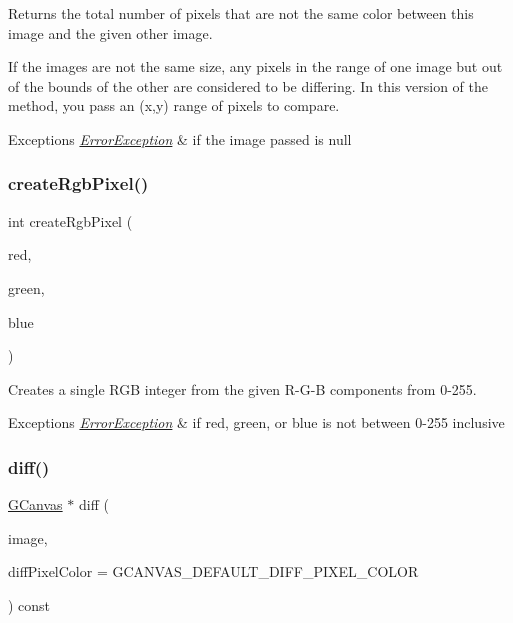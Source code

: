 Returns the total number of pixels that are not the same color between this image and the given other image. 

If the images are not the same size, any pixels in the range of one image but out of the bounds of the other are considered to be differing. In this version of the method, you pass an (x,y) range of pixels to compare. 
\begin{DoxyExceptions}{Exceptions}
{\em \mbox{\hyperlink{classErrorException}{Error\+Exception}}} & if the image passed is null \\
\hline
\end{DoxyExceptions}
\mbox{\label{classGCanvas_a10beefcf8631433d0cdddefd4e24c76a}} 
\subsubsection{\texorpdfstring{create\+Rgb\+Pixel()}{createRgbPixel()}}
{\footnotesize\ttfamily int create\+Rgb\+Pixel (\begin{DoxyParamCaption}\item[{int}]{red,  }\item[{int}]{green,  }\item[{int}]{blue }\end{DoxyParamCaption})\hspace{0.3cm}{\ttfamily [static]}}



Creates a single R\+GB integer from the given R-\/\+G-\/B components from 0-\/255. 


\begin{DoxyExceptions}{Exceptions}
{\em \mbox{\hyperlink{classErrorException}{Error\+Exception}}} & if red, green, or blue is not between 0-\/255 inclusive \\
\hline
\end{DoxyExceptions}
\mbox{\label{classGCanvas_aa4e74e40eebb70c9616065056de5c4ca}} 
\subsubsection{\texorpdfstring{diff()}{diff()}\hspace{0.1cm}{\footnotesize\ttfamily [1/2]}}
{\footnotesize\ttfamily \mbox{\hyperlink{classGCanvas}{G\+Canvas}} $\ast$ diff (\begin{DoxyParamCaption}\item[{const \mbox{\hyperlink{classGCanvas}{G\+Canvas}} \&}]{image,  }\item[{int}]{diff\+Pixel\+Color = {\ttfamily GCANVAS\+\_\+DEFAULT\+\_\+DIFF\+\_\+PIXEL\+\_\+COLOR} }\end{DoxyParamCaption}) const\hspace{0.3cm}{\ttfamily [virtual]}}




